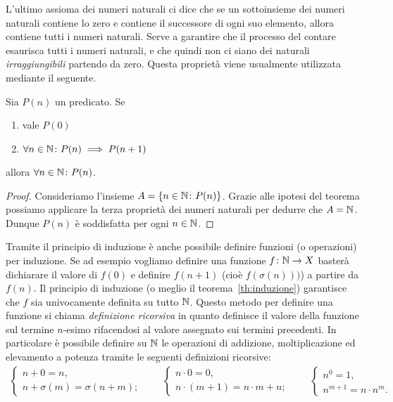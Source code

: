 L'ultimo assioma dei numeri naturali 
ci dice che se un sottoinsieme dei numeri naturali contiene lo 
zero e contiene il successore di ogni suo elemento, allora contiene tutti i 
numeri naturali.
Serve a garantire che il processo del contare esaurisca tutti 
i numeri naturali, e che quindi non ci siano dei naturali \emph{irraggiungibili}
partendo da zero.
Questa proprietà viene usualmente utilizzata mediante il seguente.


%
%
\begin{theorem}
  Sia $P(n)$ un predicato.
  Se 
  \begin{enumerate}
    \item vale $P(0)$
    \item $\forall n\in {\mathbb N}\colon P(n)\implies P(n+1)$
  \end{enumerate} 
  allora $\forall n\in {\mathbb N}\colon P(n)$.
\end{theorem}
%
\begin{proof}
  Consideriamo l'insieme $A=\{n\in {\mathbb N}\colon P(n)\}$.
  Grazie alle ipotesi del teorema possiamo applicare la terza
  proprietà dei numeri naturali per dedurre che $A={\mathbb N}$.
  Dunque $P(n)$ è soddisfatta per ogni $n\in{\mathbb N}$.
\end{proof}

Tramite il principio di induzione è anche possibile 
definire funzioni (o operazioni) per induzione.
Se ad esempio vogliamo definire una funzione $f\colon {\mathbb N}\to X$
basterà dichiarare il valore di $f(0)$ e definire $f(n+1)$ 
(cioè $f(\sigma(n)))$) a partire da $f(n)$.
Il principio di induzione (o meglio il teorema~\ref{th:induzione})
garantisce che $f$ sia univocamente definita su tutto ${\mathbb N}$.
Questo metodo per definire una funzione si chiama 
\emph{definizione ricorsiva} in quanto definisce 
il valore della funzione sul termine $n$-esimo rifacendosi
al valore assegnato sui termini precedenti.
In particolare è possibile definire
su ${\mathbb N}$ le operazioni di addizione, 
moltiplicazione ed elevamento a potenza
tramite le seguenti definizioni ricorsive:
\begin{gather*}
  \begin{cases}
    n + 0 = n,\\
    n + \sigma(m) = \sigma(n+m);
  \end{cases}
  \qquad
  \begin{cases}
    n \cdot 0 = 0,\\
    n \cdot (m+1) = n\cdot m + n;
  \end{cases}
  \qquad
  \begin{cases}
    n^0 = 1,\\
    n^{m+1} = n\cdot n^m.
  \end{cases}
\end{gather*}


